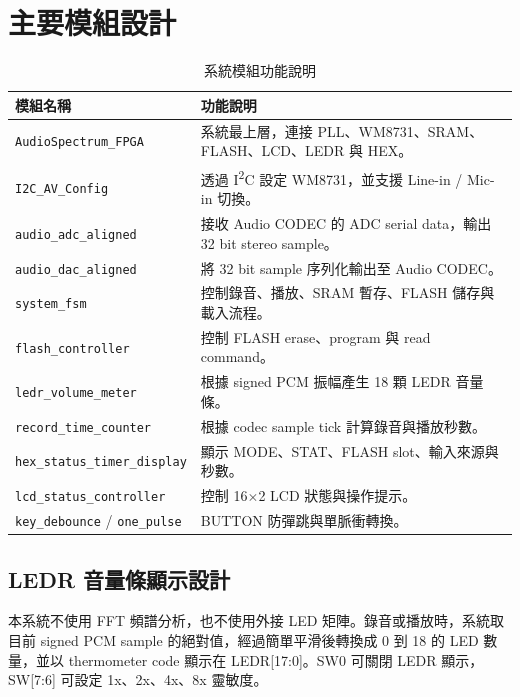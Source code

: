 \section{主要模組設計}

\begin{table}[htbp]
    \centering
    \caption{系統模組功能說明}
    \label{tab:module_description}
    \renewcommand{\arraystretch}{1.3}
    \begin{tabularx}{\textwidth}{
        >{\centering\arraybackslash}p{4cm}
        >{\raggedright\arraybackslash}X
    }
        \toprule
        模組名稱 & 功能說明 \\
        \midrule
        \texttt{AudioSpectrum\_FPGA} & 系統最上層，連接 PLL、WM8731、SRAM、FLASH、LCD、LEDR 與 HEX。 \\
        \texttt{I2C\_AV\_Config} & 透過 I\textsuperscript{2}C 設定 WM8731，並支援 Line-in / Mic-in 切換。 \\
        \texttt{audio\_adc\_aligned} & 接收 Audio CODEC 的 ADC serial data，輸出 32 bit stereo sample。 \\
        \texttt{audio\_dac\_aligned} & 將 32 bit sample 序列化輸出至 Audio CODEC。 \\
        \texttt{system\_fsm} & 控制錄音、播放、SRAM 暫存、FLASH 儲存與載入流程。 \\
        \texttt{flash\_controller} & 控制 FLASH erase、program 與 read command。 \\
        \texttt{ledr\_volume\_meter} & 根據 signed PCM 振幅產生 18 顆 LEDR 音量條。 \\
        \texttt{record\_time\_counter} & 根據 codec sample tick 計算錄音與播放秒數。 \\
        \texttt{hex\_status\_timer\_display} & 顯示 MODE、STAT、FLASH slot、輸入來源與秒數。 \\
        \texttt{lcd\_status\_controller} & 控制 16$\times$2 LCD 狀態與操作提示。 \\
        \texttt{key\_debounce} / \texttt{one\_pulse} & BUTTON 防彈跳與單脈衝轉換。 \\
        \bottomrule
    \end{tabularx}
\end{table}

\subsection{LEDR 音量條顯示設計}

本系統不使用 FFT 頻譜分析，也不使用外接 LED 矩陣。錄音或播放時，系統取目前 signed PCM sample 的絕對值，經過簡單平滑後轉換成 0 到 18 的 LED 數量，並以 thermometer code 顯示在 LEDR[17:0]。SW0 可關閉 LEDR 顯示，SW[7:6] 可設定 1x、2x、4x、8x 靈敏度。

